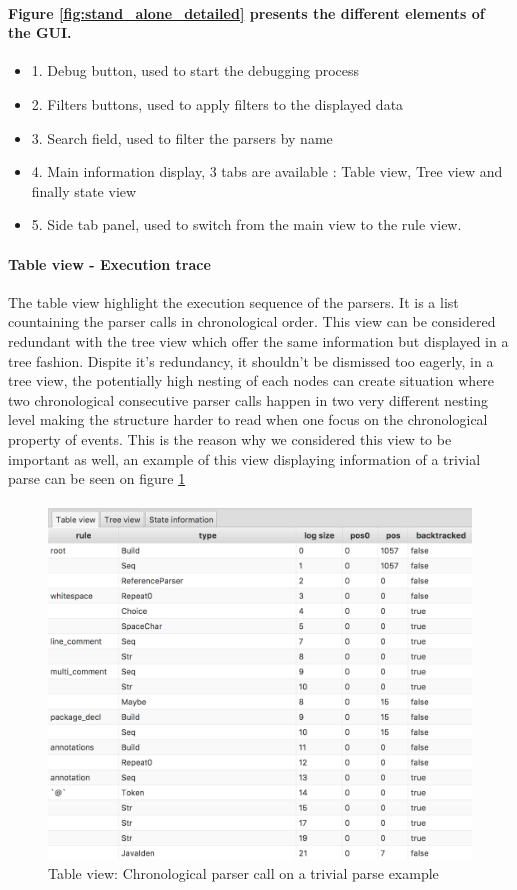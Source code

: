 		\paragraph{Figure \ref{fig:stand_alone_detailed} presents the different elements of the GUI.}
		\begin{itemize}
			\item 1. Debug button, used to start the debugging process
			\item 2. Filters buttons, used to apply filters to the displayed data
			\item 3. Search field, used to filter the parsers by name
			\item 4. Main information display, 3 tabs are available : Table view, Tree view and finally state view
			\item 5. Side tab panel, used to switch from the main view to the rule view.
		\end{itemize}

		\paragraph{Table view - Execution trace} The table view highlight the execution sequence of the parsers. It is a list countaining the parser calls in chronological order. This view can be considered redundant with the tree view which offer the same information but displayed in a tree fashion. Dispite it's redundancy, it shouldn't be dismissed too eagerly, in a tree view, the potentially high nesting of each nodes can create situation where two chronological consecutive parser calls happen in two very different nesting level making the structure harder to read when one focus on the chronological property of events. This is the reason why we considered this view to be important as well, an example of this view displaying information of a trivial parse can be seen on figure \ref{fig:tableview}

		\paragraph{}

		\begin{figure}[h]
			\centering
			\includegraphics[width=.7\textwidth] {ressources/tableview}
			\caption{Table view: Chronological parser call on a trivial parse example} 
			\label{fig:tableview}
		\end{figure}

